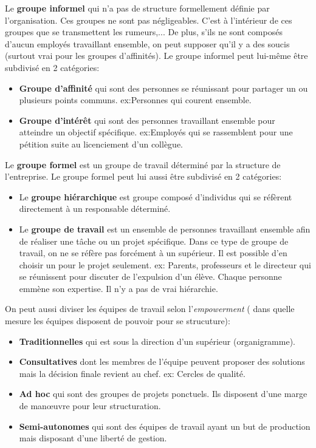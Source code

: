 \documentclass[12pt]{article}
\begin{document}
		Le \textbf{groupe informel} qui n'a pas de structure formellement définie par l'organisation. Ces groupes ne sont pas négligeables. C'est à l'intérieur de ces groupes que se transmettent les rumeurs,... De plus, s'ils ne sont composés d'aucun employés travaillant ensemble, on peut supposer qu'il y a des soucis (surtout vrai pour les groupes d'affinités). Le groupe informel peut lui-même être subdivisé en 2 catégories:
		\begin{itemize}
		\item \textbf{Groupe d'affinité} qui sont des personnes se réunissant pour partager un ou plusieurs points communs.\newline 
		ex:Personnes qui courent ensemble.
		\item \textbf{Groupe d'intérêt} qui sont des personnes travaillant ensemble pour atteindre un objectif spécifique.\newline 
		ex:Employés qui se rassemblent pour une pétition suite au licenciement d'un collègue. \newline
		\end{itemize}
		
		Le \textbf{groupe formel} est un groupe de travail déterminé par la structure de l'entreprise. Le groupe formel peut lui aussi être subdivisé en 2 catégories:
		\begin{itemize}
		\item Le \textbf{groupe hiérarchique} est groupe composé d'individus qui se réfèrent directement à un responsable déterminé.
		\item Le \textbf{groupe de travail} est un ensemble de personnes travaillant ensemble afin de réaliser une tâche ou un projet spécifique. Dans ce type de groupe de travail, on ne se réfère pas forcément à un supérieur. Il est possible d'en choisir un pour le projet seulement.\newline
		ex: Parents, professeurs et le directeur qui se réunissent pour discuter de l'expulsion d'un élève. Chaque personne emmène son expertise. Il n'y a pas de vrai hiérarchie. \newline
		\end{itemize}
		
		On peut aussi diviser les équipes de travail selon l'\textit{empowerment} ( dans quelle mesure les équipes disposent de pouvoir pour se strucuture):
		\begin{itemize}
		\item \textbf{Traditionnelles} qui est sous la direction d'un supérieur (organigramme).
		\item \textbf{Consultatives} dont les membres de l'équipe peuvent proposer des solutions mais la décision finale revient au chef. \newline
		ex: Cercles de qualité.
		\item \textbf{Ad hoc} qui sont des groupes de projets ponctuels. Ils disposent d'une marge de man\oe{}uvre pour leur structuration.
		\item \textbf{Semi-autonomes} qui sont des équipes de travail ayant un but de production mais disposant d'une liberté de gestion. 
		\end{itemize}
		
\end{document}
